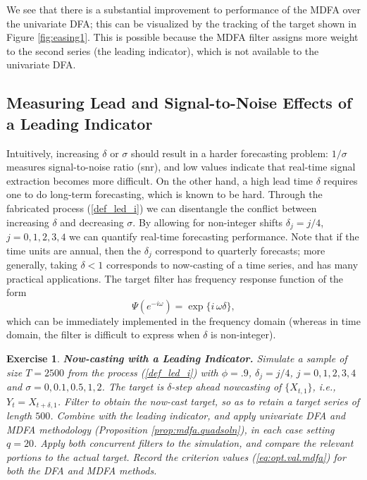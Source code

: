 \documentclass[a4paper]{book}
\newtheorem{Exercise}{Exercise}
\begin{document}
We see that there is a substantial improvement to performance of the MDFA over
 the univariate DFA; this can be visualized by the tracking of the target
 shown in Figure \ref{fig:easing1}.  This is possible because the MDFA filter
 assigns more weight to the second series (the leading indicator), which is
 not available to the univariate DFA.
 

\subsection{Measuring Lead and Signal-to-Noise Effects of a Leading Indicator}
 \label{sec:lead.snr}

Intuitively, increasing $\delta$ or $\sigma$ should result in a harder forecasting
 problem: $1/ \sigma$ measures signal-to-noise ratio (snr), and low values indicate
 that real-time signal extraction becomes more difficult.  On the other hand,
 a high lead time $\delta$ requires one to do long-term forecasting, which is
 known to be hard.
 Through the fabricated  process (\ref{def_led_i}) we can disentangle the conflict
 between increasing $\delta$ and decreasing $\sigma$.
  By allowing for  non-integer shifts $\delta_j=j/4$, $j=0,1,2,3,4$
 we can quantify real-time forecasting performance.  Note
 that if the time units are annual, then the $\delta_j$ correspond to quarterly
 forecasts; more generally, taking $\delta < 1$ corresponds to now-casting
 of a time series, and has many practical applications.
  The target filter has frequency response function of the form
\[
 \Psi (e^{-i \omega}) = \exp \{ i \, \omega \delta \},
\]
 which can be immediately   implemented in the frequency domain
 (whereas in time domain, the filter is difficult to express
 when $\delta$ is non-integer).
 

\begin{Exercise} {\bf Now-casting with a Leading Indicator.} \rm
\label{exer:nowmdfa-udfa}
 Simulate a sample of size $T=2500$ from the process (\ref{def_led_i}) with
 $\phi = .9$, $\delta_j=j/4$, $j=0,1,2,3,4$ and 
$\sigma = 0,0.1,0.5,1,2$.  The target is $\delta$-step
 ahead nowcasting of $\{ X_{t,1} \}$, i.e., $Y_t = X_{t+\delta,1}$.
 Filter to obtain the now-cast target, so as to retain a target series
 of length $500$.  Combine with the leading indicator, and 
  apply univariate DFA and MDFA methodology (Proposition \ref{prop:mdfa.quadsoln}),
 in each case setting $q=20$.  
  Apply both concurrent filters 
 to the simulation, and compare the relevant portions to the actual
 target.  Record the criterion values  (\ref{eq:opt.val.mdfa})
 for both the DFA and MDFA methods.
\end{Exercise}
\end{document}

